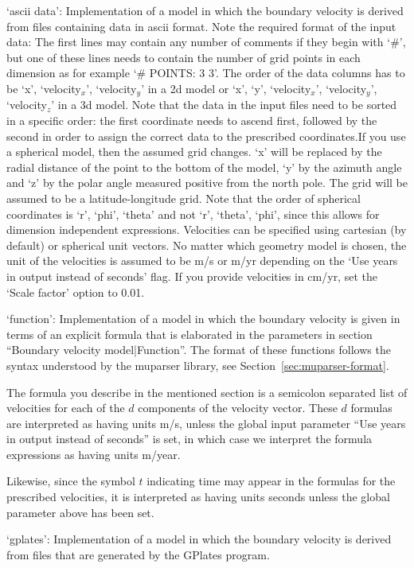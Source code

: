 \begin{itemize}
`ascii data': Implementation of a model in which the boundary velocity is derived from files containing data in ascii format. Note the required format of the input data: The first lines may contain any number of comments if they begin with `\#', but one of these lines needs to contain the number of grid points in each dimension as for example `\# POINTS: 3 3'. The order of the data columns has to be `x', `velocity${}_x$', `velocity${}_y$' in a 2d model or `x', `y', `velocity${}_x$', `velocity${}_y$', `velocity${}_z$' in a 3d model. Note that the data in the input files need to be sorted in a specific order: the first coordinate needs to ascend first, followed by the second in order to assign the correct data to the prescribed coordinates.If you use a spherical model, then the assumed grid changes. `x' will be replaced by the radial distance of the point to the bottom of the model, `y' by the azimuth angle and `z' by the polar angle measured positive from the north pole. The grid will be assumed to be a latitude-longitude grid. Note that the order of spherical coordinates is `r', `phi', `theta' and not `r', `theta', `phi', since this allows for dimension independent expressions. Velocities can be specified using cartesian (by default) or spherical unit vectors. No matter which geometry model is chosen, the unit of the velocities is assumed to be m/s or m/yr depending on the `Use years in output instead of seconds' flag. If you provide velocities in cm/yr, set the `Scale factor' option to 0.01.

`function': Implementation of a model in which the boundary velocity is given in terms of an explicit formula that is elaborated in the parameters in section ``Boundary velocity model|Function''. The format of these functions follows the syntax understood by the muparser library, see Section~\ref{sec:muparser-format}.

The formula you describe in the mentioned section is a semicolon separated list of velocities for each of the $d$ components of the velocity vector. These $d$ formulas are interpreted as having units m/s, unless the global input parameter ``Use years in output instead of seconds'' is set, in which case we interpret the formula expressions as having units m/year.

Likewise, since the symbol $t$ indicating time may appear in the formulas for the prescribed velocities, it is interpreted as having units seconds unless the global parameter above has been set.

`gplates': Implementation of a model in which the boundary velocity is derived from files that are generated by the GPlates program.


\end{itemize}
